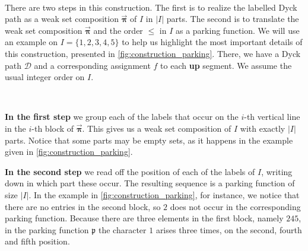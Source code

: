 \documentclass[12pt, reqno]{amsart}
\theoremstyle{definition}
\newcommand{\opi}{\vec{\boldsymbol{\pi}}}
\begin{document}
\

There are two steps in this construction.
The first is to realize the labelled Dyck path as a weak set composition $\opi$ of $I$ in $|I|$ parts. The second is to translate the weak set composition $\opi$ and the order $\leq $ in $I$ as a parking function.
We will use an example on $I = \{1, 2, 3, 4, 5\}$ to help us highlight the most important details of this construction, presented in \cref{fig:construction_parking}.
There, we have a Dyck path $\mathcal D$ and a corresponding assignment $f$ to each \textbf{up} segment.
We assume the usual integer order on $I$.

\

\textbf{In the first step} we group each of the labels that occur on the $i$-th vertical line in the $i$-th block of $\opi$.
This gives us a weak set composition of $I$ with exactly $|I|$ parts.
Notice that some parts may be empty sets, as it happens in the example given in \cref{fig:construction_parking}.

\textbf{In the second step} we read off the position of each of the labels of $I$, writing down in which part these occur. The resulting sequence is a parking function of size $|I|$.
In the example in \cref{fig:construction_parking}, for instance, we notice that there are no entries in the second block, so $2$ does not occur in the corresponding parking function.
Because there are three elements in the first block, namely $245$, in the parking function $\mathfrak p $ the character $1$ arises three times, on the second, fourth and fifth position.
\end{document}
